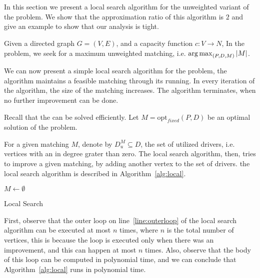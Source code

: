 \section{\UWCARPOOL{}}
\label{sub:uwcm}
In this section we present a local search algorithm for the unweighted
variant of the problem.
We show that the approximation ratio of this algorithm is $2$ and give an example
to show that our analysis is tight.

Given a directed graph $G = (V, E)$, 
and a capacity function ${c : V \rightarrow N}$, 
In the \textsc{\UWCARPOOL{}} problem, 
we seek for a maximum unweighted matching, 
i.e. $\operatorname*{arg\,max}_{(P, D, M)}{|M|}$.

We can now present a simple local search algorithm for the problem, 
the algorithm maintains a feasible matching through its running.
In every iteration of the algorithm, the size of the matching increases.
The algorithm terminates, when no further improvement can be done. 

Recall that the \FIXEDCARPOOL{} can be solved efficiently.
Let $M = \text{opt}_{fixed}(P, D)$ be an optimal solution of the
\FIXEDCARPOOL{} problem.
%

For a given matching $M$, denote by $D^M_u \subseteq D$, 
the set of utilized drivers, 
i.e. vertices with an in degree grater than zero.
The local search algorithm, then, tries to improve a given matching, 
by adding another vertex to the set of drivers.
the local search algorithm is described in
Algorithm~\ref{alg:local}.

\begin{algorithm}
\label{alg:local}
$M \leftarrow \emptyset$	\\
\caption{Local Search}
\end{algorithm}

First, observe that the outer loop on line~\ref{line:outerloop} of the local search algorithm
can be executed at most $n$ times, 
where $n$ is the total number of vertices, 
this is because the loop is executed only when there was an improvement, 
and this can happen at most $n$ times.
Also, observe that the body of this loop can be computed in polynomial time, 
and we can conclude that Algorithm~\ref{alg:local} runs in polynomial time.
    
